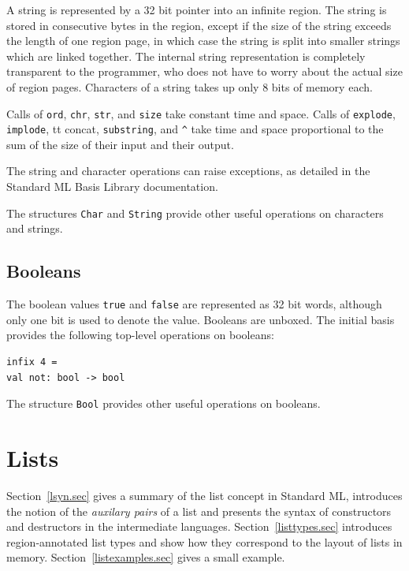 \documentclass[12pt]{book}
\begin{document}
A string is represented by a 32 bit pointer into an infinite region.
The string is stored in consecutive bytes in the region, except if the
size of the string exceeds the length of one region page, in which
case the string is split into smaller strings which are linked
together. The internal string representation is completely transparent
to the programmer, who does not have to worry about the actual size of
region pages. Characters of a string takes up only 8 bits of
memory each.

Calls of {\tt ord}, {\tt chr}, {\tt str}, and {\tt size} take constant
time and space.  Calls of {\tt explode}, {\tt implode}, {tt concat},
{\tt substring}, and \verb+^+ take time and space proportional to the
sum of the size of their input and their output.

The string and character operations can raise exceptions, as detailed in the
Standard ML Basis Library documentation.

The structures {\tt Char} and {\tt String} provide other useful
operations on characters and strings.

\section{Booleans}
The boolean values {\tt true} and {\tt false} are represented as 32
bit words, although only one bit is used to denote the value. Booleans
are unboxed. The initial basis provides the following top-level
operations on booleans:\index{{\tt =}}
\begin{verbatim}
infix 4 =
val not: bool -> bool
\end{verbatim}
The structure {\tt Bool} provides other useful operations on booleans.

%
\chapter{Lists}
\label{lists.sec}
%
Section~\ref{lsyn.sec} gives
a summary of the list concept in Standard ML, introduces
the notion of the {\em auxilary pairs} of a list and presents the
syntax of constructors and destructors in the intermediate languages.
Section~\ref{listtypes.sec} introduces region-annotated list types and
show how they correspond to the layout of lists in memory. 
Section~\ref{listexamples.sec} gives a small example.
\end{document}
